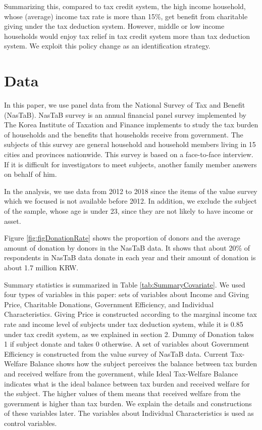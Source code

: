 \documentclass[ review  , 3p ]{elsarticle}
\begin{document}
  Summarizing this, compared to tax credit system, the high income household, whose (average) income tax rate is more than 15\%, get benefit from charitable giving under the tax deduction system. However, middle or low income households would enjoy tax relief in tax credit system more than tax deduction system. We exploit this policy change as an identification strategy.
  
  \hypertarget{data}{%
  \section{Data}\label{data}}
  
  In this paper, we use panel data from the National Survey of Tax and Benefit (NasTaB).
  NasTaB survey is an annual financial panel survey implemented by The Korea Institute of Taxation and Finance implements to study the tax burden of households and the benefits that households receive from government. The subjects of this survey are general household and household members living in 15 cities and provinces nationwide. This survey is based on a face-to-face interview. If it is difficult for investigators to meet subjects, another family member answers on behalf of him.
  
  In the analysis, we use data from 2012 to 2018 since the items of the value survey which we focused is not available before 2012. In addition, we exclude the subject of the sample, whose age is under 23, since they are not likely to have income or asset.
  
  Figure \ref{fig:figDonationRate} shows the proportion of donors and the average amount of donation by donors in the NasTaB data. It shows that about 20\% of respondents in NasTaB data donate in each year and their amount of donation is about 1.7 million KRW.
  
  Summary statistics is summarized in Table \ref{tab:SummaryCovariate}. We used four types of variables in this paper: sets of variables about Income and Giving Price, Charitable Donations, Government Efficiency, and Individual Characteristics. Giving Price is constructed according to the marginal income tax rate and income level of subjects under tax deduction system, while it is 0.85 under tax credit system, as we explained in section 2. Dummy of Donation takes 1 if subject donate and takes 0 otherwise. A set of variables about Government Efficiency is constructed from the value survey of NasTaB data. Current Tax-Welfare Balance shows how the subject perceives the balance between tax burden and received welfare from the government, while Ideal Tax-Welfare Balance indicates what is the ideal balance between tax burden and received welfare for the subject. The higher values of them means that received welfare from the government is higher than tax burden. We explain the details and constructions of these variables later. The variables about Individual Characteristics is used as control variables.
  
\end{document}
